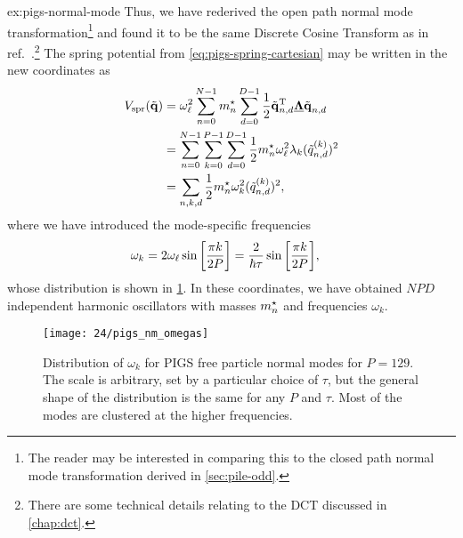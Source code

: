 \begin{DefAnswer}{ex:pigs-normal-mode}
	Thus, we have rederived the open path normal mode transformation\footnote{
		The reader may be interested in comparing this to the closed path normal mode transformation derived in \cref{sec:pile-odd}.
	} and found it to be the same Discrete Cosine Transform as in ref.~\cite{constable2012path}.\footnote{
		There are some technical details relating to the DCT discussed in \vref{chap:dct}.
	}
	The spring potential from \cref{eq:pigs-spring-cartesian} may be written in the new coordinates as
	\begin{subequations}
	\begin{align}
		V_\mathrm{spr}(\tilde{\bm{\mathbf{q}}})
		&= \omega_\ell^2 \sum_{n=0}^{N-1} {m}^\star_n \sum_{d=0}^{D-1} \frac{1}{2} \tilde{\bm{\mathbf{q}}}_{n,d}^\mathrm{T} \underline{\bm{\mathbf{\Lambda}}} \tilde{\bm{\mathbf{q}}}_{n,d} \\
		&= \sum_{n=0}^{N-1} \sum_{k=0}^{P-1} \sum_{d=0}^{D-1} \frac{1}{2} {m}^\star_n \omega_\ell^2 \lambda_k (\tilde{q}_{n,d}^{(k)})^2 \\
		&= \sum_{n,k,d} \frac{1}{2} {m}^\star_n \omega_k^2 (\tilde{q}_{n,d}^{(k)})^2,
	\end{align}
	\end{subequations}
	where we have introduced the mode-specific frequencies
	\begin{align}
		\omega_k
		&= 2 \omega_\ell \sin{\left[ \frac{\pi k}{2 P} \right]}
		= \frac{2}{\hbar \tau} \sin{\left[ \frac{\pi k}{2 P} \right]},
	\end{align}
	whose distribution is shown in \cref{fig:pigs-nm-omegas}.
	In these coordinates, we have obtained $N P D$ independent harmonic oscillators with masses ${m}^\star_n$ and frequencies $\omega_k$.

	\begin{figure}[H]
		\centering
		\texttt{[image: 24/pigs\_nm\_omegas]}
		\caption[
			PIGS normal mode frequency distribution
		]{
			Distribution of $\omega_k$ for PIGS free particle normal modes for $P = 129$.
			The scale is arbitrary, set by a particular choice of $\tau$, but the general shape of the distribution is the same for any $P$ and $\tau$.
			Most of the modes are clustered at the higher frequencies.
		}
		\label{fig:pigs-nm-omegas}
	\end{figure}


\end{DefAnswer}

